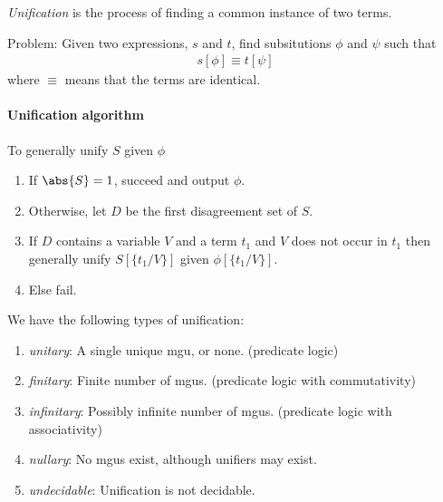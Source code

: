 \documentclass{article}
\begin{document}
\begin{definition}
	\emph{Unification} is the process of finding a common instance of two terms.

	Problem: Given two expressions, $s$ and $t$, find subsitutions
	$\phi$ and $\psi$ such that
	\begin{align*}
		s[\phi] \equiv t[\psi]
	\end{align*}
	where $\equiv$ means that the terms are identical.
\end{definition}

\paragraph{Unification algorithm}

To generally unify $S$ given $\phi$
\begin{enumerate}
	\item If $\abs{S}=1$, succeed and output $\phi$.
	\item Otherwise, let $D$ be the first disagreement set of $S$.
	\item If $D$ contains a variable $V$ and a term $t_1$ and $V$
	      does not occur in $t_1$ then generally unify $S[\{t_1/V\}]$ given $\phi[\{t_1/V\}]$.
	\item Else fail.
\end{enumerate}

\begin{definition}
	We have the following types of unification:
	\begin{enumerate}
		\item \emph{unitary}: A single unique mgu, or none. (predicate logic)
		\item \emph{finitary}: Finite number of mgus. (predicate logic with commutativity)
		\item \emph{infinitary}: Possibly infinite number of mgus. (predicate logic with associativity)
		\item \emph{nullary}: No mgus exist, although unifiers may exist.
		\item \emph{undecidable}: Unification is not decidable.
	\end{enumerate}
\end{definition}
\end{document}

